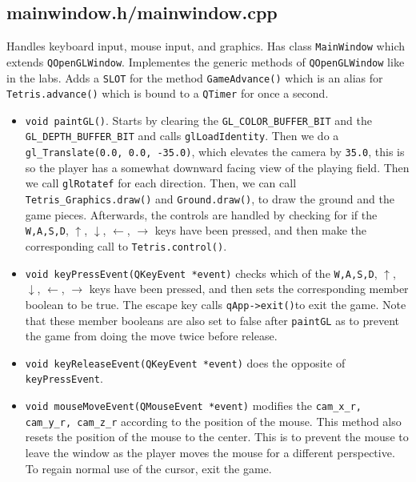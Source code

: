 \documentclass[letterpaper, 12pt]{article}
\begin{document}
\subsection{mainwindow.h/mainwindow.cpp}
Handles keyboard input, mouse input, and graphics.
Has class \verb|MainWindow| which extends \verb|QOpenGLWindow|.
Implementes the generic methods of \verb|QOpenGLWindow| like in the labs.
Adds a \verb|SLOT| for the method \verb|GameAdvance()| which is an alias for \verb|Tetris.advance()| which is bound to a \verb|QTimer| for once a second.
\begin{itemize}
    \item \verb|void paintGL()|.
        Starts by clearing the \verb|GL_COLOR_BUFFER_BIT| and the \verb|GL_DEPTH_BUFFER_BIT| and calls \verb|glLoadIdentity|.
        Then we do a \verb|gl_Translate(0.0, 0.0, -35.0)|, which elevates the camera by \verb|35.0|, this is so the player has a somewhat downward facing view of the playing field.
        Then we call \verb|glRotatef| for each direction.
        Then, we can call \verb|Tetris_Graphics.draw()| and \verb|Ground.draw()|, to draw the ground and the game pieces.
        Afterwards, the controls are handled by checking for if the \verb|W,A,S,D|, $\uparrow$, $\downarrow$, $\leftarrow$, $\rightarrow$ keys have been pressed, and then make the corresponding call to \verb|Tetris.control()|.
    \item \verb|void keyPressEvent(QKeyEvent *event)| checks which of the \verb|W,A,S,D|, $\uparrow$, $\downarrow$, $\leftarrow$, $\rightarrow$ keys have been pressed, and then sets the corresponding member boolean to be true.
        The escape key calls \verb|qApp->exit()|to exit the game.
        Note that these member booleans are also set to false after \verb|paintGL| as to prevent the game from doing the move twice before release.
    \item \verb|void keyReleaseEvent(QKeyEvent *event)| does the opposite of \verb|keyPressEvent|.
    \item \verb|void mouseMoveEvent(QMouseEvent *event)| modifies the \verb|cam_x_r, cam_y_r, cam_z_r| according to the position of the mouse.
        This method also resets the position of the mouse to the center.
        This is to prevent the mouse to leave the window as the player moves the mouse for a different perspective.
        To regain normal use of the cursor, exit the game.
\end{itemize}
\end{document}
